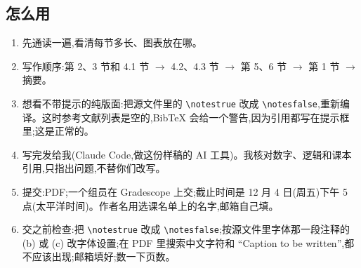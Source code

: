 \documentclass{article}
\begin{document}
\subsection*{怎么用}
\begin{enumerate}[nosep,leftmargin=1.5em]
\item 先通读一遍,看清每节多长、图表放在哪。
\item 写作顺序:第 2、3 节和 4.1 节 $\rightarrow$ 4.2、4.3 节 $\rightarrow$ 第 5、6 节 $\rightarrow$ 第 1 节 $\rightarrow$ 摘要。
\item 想看不带提示的纯版面:把源文件里的 \texttt{\textbackslash notestrue} 改成 \texttt{\textbackslash notesfalse},重新编译。这时参考文献列表是空的,BibTeX 会给一个警告,因为引用都写在提示框里;这是正常的。
\item 写完发给我(Claude Code,做这份样稿的 AI 工具)。我核对数字、逻辑和课本引用,只指出问题,不替你们改写。
\item 提交:PDF;一个组员在 Gradescope 上交;截止时间是 12 月 4 日(周五)下午 5 点(太平洋时间)。作者名用选课名单上的名字,邮箱自己填。
\item 交之前检查:把 \texttt{\textbackslash notestrue} 改成 \texttt{\textbackslash notesfalse};按源文件里字体那一段注释的 (b) 或 (c) 改字体设置;在 PDF 里搜索中文字符和 ``Caption to be written'',都不应该出现;邮箱填好;数一下页数。
\end{enumerate}
\end{document}
